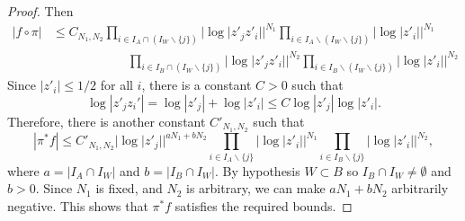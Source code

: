 \documentclass[10pt,a4paper]{amsart}
\begin{document}
\begin{proof}
  Then 
  \begin{align*}
    \left | f\circ \pi 
    \right|&\le C_{N_1,N_2}
    \prod_{i\in I_A\cap (I_{W}\smallsetminus \{j\})}|\log|z'_{j}z'_i||^{N_1}
     \prod_{i\in I_A\smallsetminus (I_{W}\smallsetminus \{j\})}|\log|z'_i||^{N_1}\\
    &\qquad \qquad \qquad \prod_{i\in I_B\cap (I_{W}\smallsetminus \{j\})}|\log|z'_{j}z'_i||^{N_2}
     \prod_{i\in I_B\smallsetminus (I_{W}\smallsetminus \{j\})}|\log|z'_i||^{N_2}
  \end{align*}
  Since $|z'_{i}|\le 1/2$ for all $i$, there is a constant $C>0$ such
  that
  \begin{displaymath}
    \log|z'_{j}z_i'|=\log|z'_{j}|+\log|z'_i|\le C\log|z'_{j}|\log|z'_i|. 
  \end{displaymath}
  Therefore, there is another constant $C'_{N_{1},N_{2}}$ such that 
  \begin{equation}\label{eq:20}
    \left | \pi ^{\ast }f 
    \right|\le C'_{N_1,N_2} |\log|z'_j||^{aN_{1}+bN_2}
    \prod_{i\in I_A\smallsetminus \{j\}}|\log|z'_i||^{N_1}
   \prod_{i\in I_{B}\smallsetminus \{j\}}|\log|z'_i||^{N_2},
 \end{equation}
 where $a=|I_{A}\cap I_{W}|$ and $b=|I_{B}\cap I_{W}|$. By hypothesis
 $W\subset B$ so $I_{B}\cap I_{W}\not = \emptyset $ and $b>0$. Since
 $N_{1}$ is fixed, and $N_{2}$ is arbitrary, we can make
 $aN_{1}+bN_{2}$ arbitrarily negative. This shows that   $\pi
 ^{\ast}f$ satisfies the required bounds.


\end{proof}
\end{document}
